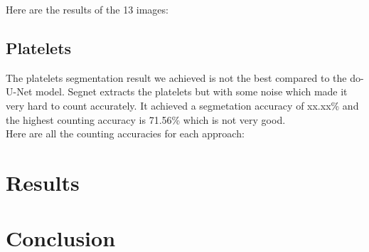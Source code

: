 Here are the results of the 13 images:



\subsection{Platelets}
\hspace{\parindent}
The platelets segmentation result we achieved is not the best compared to the do-U-Net model. Segnet extracts the platelets but with some noise which made it very hard to count accurately.
It achieved a segmetation accuracy of xx.xx\% and the highest counting accuracy is 71.56\% which is not very good.\\
Here are all the counting accuracies for each approach:



\section{Results}
\vspace{0.2in}
\hspace{\parindent}

\section{Conclusion}

\newpage
